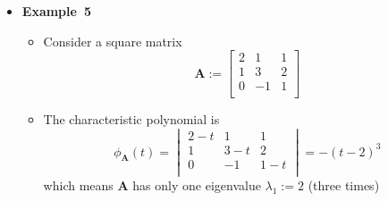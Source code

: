 \documentclass[12pt,a4paper]{article}
\begin{document}
\begin{itemize}
\begin{itemize}
  \end{itemize}

\item \textbf{Example~5}
  \begin{itemize}
  \item Consider a square matrix
    \begin{equation}\nonumber%
      \bm{A} :=
      \begin{bmatrix}
        2 & 1 & 1 \\
        1 & 3 & 2 \\
        0 & -1 & 1 \\
      \end{bmatrix}
    \end{equation}
  \item The characteristic polynomial is
    \begin{equation}\nonumber%
      \phi_{\bm{A}}(t) = 
      \begin{vmatrix}
        2-t & 1 & 1 \\
        1 & 3-t & 2 \\
        0 & -1 & 1-t \\
      \end{vmatrix}
      = - (t-2)^{3}
    \end{equation}
    which means $\bm{A}$ has only one eigenvalue $\lambda_{1}:=2$ (three times)


\end{itemize}
\end{itemize}
\end{document}
